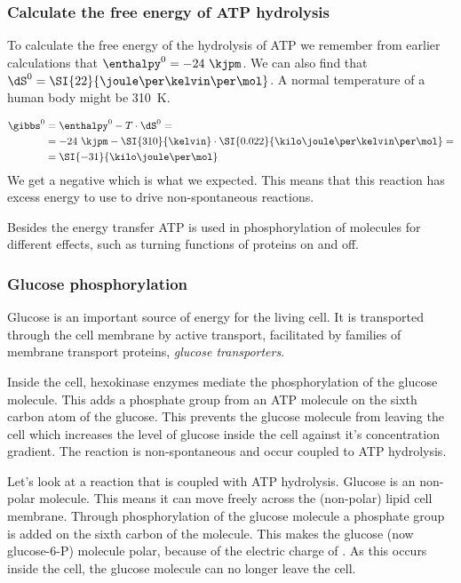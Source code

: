 \documentclass[../mit-general-chemistry.tex]{subfiles}
\begin{document}



\subsubsection{Calculate the free energy of ATP hydrolysis}

To calculate the free energy of the hydrolysis of ATP we remember from
earlier calculations that $\enthalpy^0 = -24~\kjpm$. We can also find
that $\dS^0 = \SI{22}{\joule\per\kelvin\per\mol}$. A normal
temperature of a human body might be \SI{310}{\kelvin}.

\begin{align*}
  \gibbs^0 &= \enthalpy^0 - T \cdot \dS^0 =\\
  &=  -24~\kjpm - \SI{310}{\kelvin} \cdot \SI{0.022}{\kilo\joule\per\kelvin\per\mol} =\\
  &= \SI{-31}{\kilo\joule\per\mol} \\
\end{align*}
We get a negative \gibbs which is what we expected. This means that
this reaction has excess energy to use to drive non-spontaneous
reactions.

Besides the energy transfer ATP is used in phosphorylation of
molecules for different effects, such as turning functions of proteins
on and off.




\subsubsection{Glucose phosphorylation}


Glucose is an important source of energy for the living cell. It is
transported through the cell membrane by active transport, facilitated
by families of membrane transport proteins, {\em glucose
  transporters}.

Inside the cell, hexokinase enzymes mediate the phosphorylation of the
glucose molecule. This adds a phosphate group from an ATP molecule on
the sixth carbon atom of the glucose. This prevents the glucose
molecule from leaving the cell which increases the level of glucose
inside the cell against it's concentration gradient. The reaction is
non-spontaneous and occur coupled to ATP hydrolysis.


Let's look at a reaction that is coupled with ATP hydrolysis. Glucose
is an non-polar molecule. This means it can move freely across the
(non-polar) lipid cell membrane. Through phosphorylation of the glucose
molecule a phosphate group is added on the sixth carbon of the
molecule. This makes the glucose (now glucose-6-P) molecule polar,
because of the electric charge of . As this occurs inside the cell,
the glucose molecule can no longer leave the cell.
\end{document}
